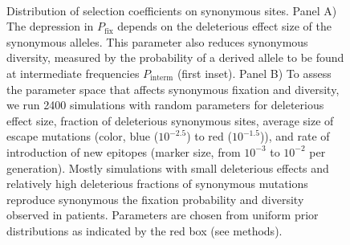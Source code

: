 \documentclass[rmp, twocolumn]{revtex4}
\newcommand{\pfix}{P_{\mathrm{fix}}}
\begin{document}
\begin{figure}
\begin{center}
\\
\caption{Distribution of selection coefficients on synonymous sites. Panel A)
The depression in $\pfix$ depends on the deleterious effect size 
of the synonymous alleles. This parameter also reduces synonymous
diversity, measured by the probability of a derived allele to be found at
intermediate frequencies $P_\text{interm}$ (first inset).
Panel B) To assess the parameter space that affects synonymous fixation and
diversity, we run 2400 simulations with random parameters for deleterious effect
size, fraction of deleterious synonymous sites, average size of escape
mutations (color, blue ($10^{-2.5}$) to red ($10^{-1.5}$)), and rate of
introduction of new epitopes (marker size, from $10^{-3}$ to $10^{-2}$ per
generation). Mostly simulations with small deleterious effects and relatively
high deleterious fractions of synonymous mutations reproduce synonymous the
fixation probability and diversity observed in patients. Parameters are chosen
from uniform prior distributions as indicated by the red box (see methods).}
\label{fig:simheat}
\end{center}
\end{figure}
\end{document}
